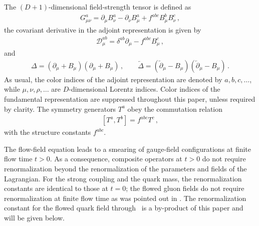 The $(D+1)$-dimensional field-strength tensor is defined as
\begin{align}
  G_{\mu\nu}^a = \partial_\mu B_\nu^a - \partial_\nu B_\mu^a + f^{abc}
  B_\mu^b B_\nu^c\,,
\end{align}
the covariant derivative in the adjoint representation is given by
\begin{align}
  \mathcal{D}_\mu^{ab} = \delta^{ab} \partial_\mu - f^{abc} B_\mu^c\,,
\end{align}
and
\begin{equation}
  \begin{split}
    \Delta = (\partial_\mu + B_\mu) (\partial_\mu + B_\mu)\,,\qquad
    \overleftarrow{\Delta} = (\overleftarrow\partial\!_\mu - B_\mu)
    (\overleftarrow\partial\!_\mu - B_\mu)\,.
  \end{split}
\end{equation}
As usual, the color indices of the adjoint representation are denoted by
$a,b,c,\ldots$, while $\mu,\nu,\rho,\ldots$ are $D$-dimensional Lorentz
indices. Color indices of the fundamental representation are suppressed
throughout this paper, unless required by clarity.  The symmetry
generators $T^a$ obey the commutation relation
\begin{equation}
  \begin{split}
    [T^a,T^b] = f^{abc}T^c\,,
  \end{split}
\end{equation}
with the structure constants $f^{abc}$.

The flow-field equation leads to a smearing of gauge-field
configurations at finite flow time $t>0$. As a consequence, composite
operators at $t>0$ do not require renormalization beyond the
renormalization of the parameters and fields of the Lagrangian. For the
strong coupling and the quark mass, the renormalization constants are
identical to those at $t=0$; the flowed gluon fields do not require
renormalization at finite flow time as was pointed out in .
The renormalization constant for the flowed quark field through
\nnlo\ is a by-product of this paper and will be given below.
